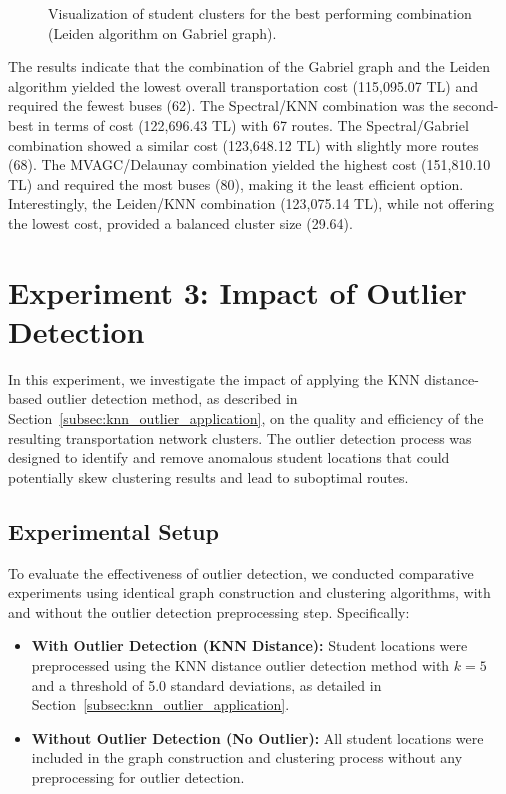 \begin{figure}[h]
    \centering
    \caption{Visualization of student clusters for the best performing combination (Leiden algorithm on Gabriel graph).}
    \label{fig:best_clustering_viz}
\end{figure}

The results indicate that the combination of the Gabriel graph and the Leiden algorithm yielded the lowest overall transportation cost (115,095.07 TL) and required the fewest buses (62). The Spectral/KNN combination was the second-best in terms of cost (122,696.43 TL) with 67 routes. The Spectral/Gabriel combination showed a similar cost (123,648.12 TL) with slightly more routes (68). The MVAGC/Delaunay combination yielded the highest cost (151,810.10 TL) and required the most buses (80), making it the least efficient option. Interestingly, the Leiden/KNN combination (123,075.14 TL), while not offering the lowest cost, provided a balanced cluster size (29.64).

\section{Experiment 3: Impact of Outlier Detection}
\label{sec:exp_outlier}

In this experiment, we investigate the impact of applying the KNN distance-based outlier detection method, as described in Section~\ref{subsec:knn_outlier_application}, on the quality and efficiency of the resulting transportation network clusters. The outlier detection process was designed to identify and remove anomalous student locations that could potentially skew clustering results and lead to suboptimal routes.

\subsection{Experimental Setup}
\label{subsec:outlier_setup}

To evaluate the effectiveness of outlier detection, we conducted comparative experiments using identical graph construction and clustering algorithms, with and without the outlier detection preprocessing step. Specifically:

\begin{itemize}
    \item \textbf{With Outlier Detection (KNN Distance):} Student locations were preprocessed using the KNN distance outlier detection method with $k=5$ and a threshold of 5.0 standard deviations, as detailed in Section~\ref{subsec:knn_outlier_application}.
    \item \textbf{Without Outlier Detection (No Outlier):} All student locations were included in the graph construction and clustering process without any preprocessing for outlier detection.
\end{itemize}

